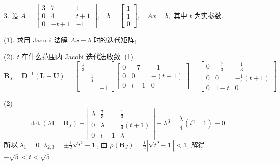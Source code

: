 \begin{tcolorbox}[breakable,enhanced,arc=0mm,outer arc=0mm,
		boxrule=0pt,toprule=1pt,leftrule=0pt,bottomrule=1pt, rightrule=0pt,left=0.2cm,right=0.2cm,
		titlerule=0.5em,toptitle=0.1cm,bottomtitle=-0.1cm,top=0.2cm,
		colframe=white!10!biru,colback=white!90!biru,coltitle=white,
            coltext=black,title =2024-04, title style={white!10!biru}, before skip=8pt, after skip=8pt,before upper=\hspace{2em},
		fonttitle=\bfseries,fontupper=\normalsize]
  
3. 设
$
A=\left[\begin{array}{ccc}
3 & 7 & 1 \\
0 & 4 & t+1 \\
0 & -t+1 & -1
\end{array}\right], \quad b=\left[\begin{array}{l}
1 \\
1 \\
0
\end{array}\right], \quad A x=b,
$
其中 $ t $ 为实参数.

(1). 求用 Jacobi 法解 $ A x=b $ 时的迭代矩阵;

(2). $ t $ 在什么范围内 Jacobi 迭代法收敛.
\tcblower
(1)
$$
\boldsymbol{B}_{J}=\boldsymbol{D}^{-1}(\boldsymbol{L}+\boldsymbol{U})=\left[\begin{array}{ccc}
\frac{1}{3} &  &  \\
 & \frac{1}{4} &  \\
 &  & -1
\end{array}\right]\left[\begin{array}{ccc}
0 & -7 & -1 \\
0 & 0 & -(t+1) \\
0 & t-1 & 0
\end{array}\right]=\left[\begin{array}{ccc}
0 & -\frac{7}{3} & -\frac{1}{3} \\
0 & 0 & -\frac{1}{4}(t+1) \\
0 & 1-t & 0
\end{array}\right]
$$

(2)
$$\operatorname{det}\left(\lambda \boldsymbol{I}-\boldsymbol{B}_{J}\right)=\left|\begin{array}{ccc}
\lambda & \frac{7}{3} & \frac{1}{3} \\
0 & \lambda & \frac{1}{4}(t+1) \\
0 & t-1 & \lambda
\end{array}\right|=\lambda^{3}-\frac{\lambda}{4}\left(t^{2}-1\right)=0$$
所以 $ \lambda_1=0 $, $ \lambda_{2,3}=\pm\frac{1}{2} \sqrt{t^{2}-1} $, 由 $ \rho\left(\boldsymbol{B}_{J}\right)=\frac{1}{2} |\sqrt{t^{2}-1}|<1 $, 解得 $  -\sqrt{5}<t<\sqrt{5} $.
\end{tcolorbox}


